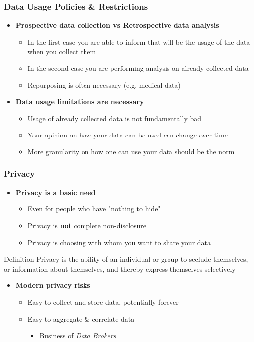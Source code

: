 \documentclass{beamer}
\begin{document}
\begin{frame}\frametitle{Data Usage Policies \& Restrictions}
\begin{itemize}
	\setlength\itemsep{1em}
	\item {\bf Prospective data collection vs Retrospective data analysis}
	\begin{itemize}
		\item In the first case you are able to inform that will be the usage of the data when you collect them
		\item In the second case you are performing analysis on already collected data
		\item Repurposing is often necessary (e.g. medical data)
	\end{itemize}
	\item {\bf Data usage limitations are necessary}
	\begin{itemize}
		\item Usage of already collected data is not fundamentally bad
		\item Your opinion on how your data can be used can change over time
		\item More granularity on how one can use your data should be the norm
	\end{itemize}
\end{itemize}
\end{frame}

\begin{frame}\frametitle{Privacy}
\begin{itemize}
	\item {\bf Privacy is a basic need}
	\begin{itemize}
		\item Even for people who have "nothing to hide"
		\item Privacy is {\bf not} complete non-disclosure
		\item Privacy is choosing with whom you want to share your data
	\end{itemize}
\end{itemize}
\begin{block}{Definition}
\justifying
Privacy is the ability of an individual or group to seclude themselves, or information about themselves, and thereby express themselves selectively
\end{block}
\begin{itemize}
	\item {\bf Modern privacy risks}
	\begin{itemize}
		\item Easy to collect and store data, potentially forever
		\item Easy to aggregate \& correlate data
		\begin{itemize}
		\item Business of \textit{Data Brokers}
	\end{itemize}
	\end{itemize}
\end{itemize}
\end{frame}
\end{document}
